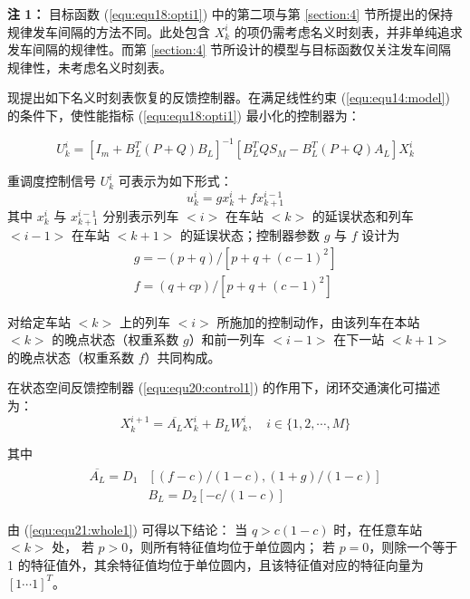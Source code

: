 \textbf{注 1：} 目标函数 (\ref{equ:equ18:opti1}) 中的第二项与第 \ref{section:4} 节所提出的保持规律发车间隔的方法不同。此处包含 $X_k^i$ 的项仍需考虑名义时刻表，并非单纯追求发车间隔的规律性。而第 \ref{section:4} 节所设计的模型与目标函数仅关注发车间隔规律性，未考虑名义时刻表。

现提出如下名义时刻表恢复的反馈控制器。在满足线性约束 (\ref{equ:equ14:model}) 的条件下，使性能指标 (\ref{equ:equ18:opti1}) 最小化的控制器为：
\begin{scriptsize}
	\begin{equation}
		U_{k}^{i}=\left[I_m+B_{L}^{T}(P+Q) B_{L}\right]^{-1}\left[B_{L}^{T} Q S_{M}-B_{L}^{T}(P+Q) A_{L}\right] X_{k}^{i}
		\label{equ:equ20:control1}
	\end{equation}
\end{scriptsize}

    重调度控制信号 $U_k^i$ 可表示为如下形式：
    \begin{equation}
    	u_{k}^{i}=g x_{k}^{i}+f x_{k+1}^{i-1}
    	\label{equ:equ20:micon1}
    \end{equation}
其中 $x_k^i$ 与 $x_{k+1}^{i-1}$ 分别表示列车 $<i>$ 在车站 $<k>$ 的延误状态和列车 $<i-1>$ 在车站 $<k+1>$ 的延误状态；控制器参数 $g$ 与 $f$ 设计为
\begin{gather*}
	g=-(p+q) /\left[p+q+(c-1)^{2}\right] \\
	f=(q+c p) /\left[p+q+(c-1)^{2}\right]
\end{gather*}

对给定车站 $<k>$ 上的列车 $<i>$ 所施加的控制动作，由该列车在本站 $<k>$ 的晚点状态（权重系数 $g$）和前一列车 $<i-1>$ 在下一站 $<k+1>$ 的晚点状态（权重系数 $f$）共同构成。

在状态空间反馈控制器 (\ref{equ:equ20:control1}) 的作用下，闭环交通演化可描述为：
\begin{equation}
	X_{k}^{i+1}=\overline{A_{L}} X_{k}^{i}+B_{L} W_{k}^{i}, \quad i \in\{1,2, \cdots, M\}
	\label{equ:equ21:whole1}
\end{equation}

其中
\begin{gather*}
	\begin{aligned}
		\overline{A_{L}}=D_{1}&[(f-c) /(1-c),(1+g) /(1-c)] \\
		&B_{L}=D_{2}[-c /(1-c)]
	\end{aligned}
\end{gather*}

由 (\ref{equ:equ21:whole1}) 可得以下结论：  
当 $q>c(1-c)$ 时，在任意车站 $<k>$ 处，  
若 $p>0$，则所有特征值均位于单位圆内；  
若 $p=0$，则除一个等于 1 的特征值外，其余特征值均位于单位圆内，且该特征值对应的特征向量为 $[1 \cdots 1]^{T}$。  

